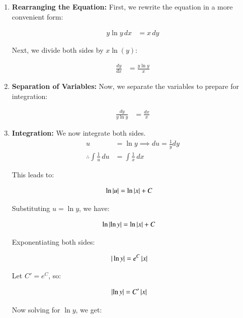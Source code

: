 \documentclass[journal]{IEEEtran}
\begin{document}
\begin{enumerate}
    \item \textbf{Rearranging the Equation:} First, we rewrite the equation in a more convenient form:

    \begin{align}
	    y \ln{y} \, dx &= x \, dy
    \end{align}

    Next, we divide both sides by $ x \ln(y) $:

    \begin{align}
	    \frac{dy}{dx} &= \frac{y \ln{y}}{x}
    \end{align}
    
    \item \textbf{Separation of Variables:} Now, we separate the variables to prepare for integration:

    \begin{align}
	    \frac{dy}{y \ln{y}} &= \frac{dx}{x}
    \end{align}
    
    \item \textbf{Integration:} We now integrate both sides.\\     
    \begin{align}
	    u &= \ln{y} \implies du = \frac{1}{y} dy \\   
	    {\therefore} \int \frac{1}{u} \, du &= \int \frac{1}{x} \, dx
    \end{align}

    This leads to:

    \begin{align}
	    \ln\left\vert u\right\vert &= \ln\left\vert x\right\vert + C
    \end{align}

		Substituting $ u = \ln{y} $, we have:

    \begin{align}
	    \ln\left\vert\ln{y}\right\vert &= \ln|x| + C
    \end{align}

    Exponentiating both sides:

    \begin{align}
	    |\ln{y}| &= e^C \left\vert x\right\vert
    \end{align}

    Let $ C' = e^C $, so:

    \begin{align}
	    \left\vert\ln{y}\right\vert&= C^\prime \left\vert x\right\vert
    \end{align}

		Now solving for $ \ln{y} $, we get:


\end{enumerate}
\end{document}
